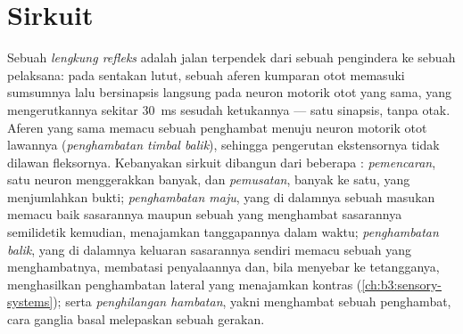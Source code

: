 \section{Sirkuit}

\begin{definition}\label{def:b3:nervous-systems:circuits}
%
Sebuah \emph{lengkung refleks} adalah jalan terpendek dari sebuah pengindera ke
sebuah pelaksana: pada sentakan lutut, sebuah aferen kumparan otot memasuki
sumsumnya lalu bersinapsis langsung pada neuron motorik otot yang sama, yang
mengerutkannya sekitar \qty{30}{ms} sesudah ketukannya --- satu sinapsis, tanpa otak.
Aferen yang sama memacu sebuah  penghambat menuju neuron
motorik otot lawannya (\emph{penghambatan timbal balik}), sehingga
pengerutan ekstensornya tidak dilawan fleksornya. Kebanyakan sirkuit
dibangun dari beberapa : \emph{pemencaran}, satu neuron menggerakkan
banyak, dan \emph{pemusatan}, banyak ke satu, yang menjumlahkan bukti;
\emph{penghambatan maju}, yang di dalamnya sebuah masukan memacu baik sasarannya
maupun sebuah  yang menghambat sasarannya semilidetik kemudian,
menajamkan tanggapannya dalam waktu; \emph{penghambatan balik}, yang di dalamnya
keluaran sasarannya sendiri memacu sebuah  yang menghambatnya,
membatasi penyalaannya dan, bila menyebar ke tetangganya, menghasilkan
penghambatan lateral yang menajamkan kontras (\cref{ch:b3:sensory-systems}); serta
\emph{penghilangan hambatan}, yakni menghambat sebuah penghambat, cara ganglia basal
melepaskan sebuah gerakan.
\end{definition}


